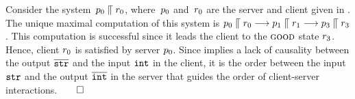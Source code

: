 

\begin{example}
\label{ex:max-comp}
 Consider the system~$p_0  \mathrel{\llceil}  r_0$, where~$p_0$
  and~$r_0$ are the server and client given in
  . The unique maximal computation of this system is
  $p_0  \mathrel{\llceil}  r_0 \mathrel{\overset{}\longrightarrow} p_1  \mathrel{\llceil}  r_1
  \mathrel{\overset{}\longrightarrow} p_3  \mathrel{\llceil}  r_3$.
This computation is successful since it leads the client to the $\textsc{good}$ state
$r_3$.
Hence, client  $r_0$ is
satisfied by server $p_0$.
%
Since \outputcommutativity implies a lack of causality
between the output $\overline{{\tt str}}$ and the input ${\tt int}$ in the
client, it is the order between the input ${\tt str}$ and the output
$\overline{\tt int}$ in the server that guides the order of client-server
interactions.\hfill$\qed$
\end{example}





